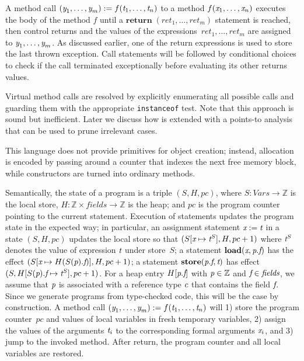 A method
call $(\textit{y}_1, \ldots, \textit{y}_m) := f(\textit{t}_1, \ldots, \textit{t}_n)$ to
a method $f(\textit{x}_1, \ldots, \textit{x}_n)$ executes the body of the method
$f$ until a $\textbf{return}\;(\textit{ret}_1, \ldots, \textit{ret}_m)$ 
statement is
reached, then control returns and the values of the
expressions~$\textit{ret}_1, \ldots, \textit{ret}_m$ are assigned to $\textit{y}_1,
\ldots, \textit{y}_m$. As discussed earlier, one of the return expressions is
used to store the last thrown exception. Call statements will be followed
by conditional choices to check if the call terminated exceptionally before
evaluating its other returns values.

Virtual method calls are resolved by explicitly enumerating
all possible calls and guarding them with the appropriate \texttt{instanceof}
test. Note that this approach is sound but inefficient. Later we discuss
how \jayhorn is extended with a points-to analysis that can be used to
prune irrelevant cases. 

This language does not provide primitives 
for object creation; instead, allocation is encoded by passing around a counter
that indexes the next free memory block, while constructors are turned
into ordinary methods.


Semantically, the state of a program is a triple $(S, H, pc)$, where
$S : \textit{Vars} \rightarrow \mathbb{Z}$ is the local store, $H :
\mathbb{Z}\times \textit{fields} \rightarrow \mathbb{Z}$ is the heap;
and $pc$ is the program counter pointing to the current
statement. Execution of statements updates the program state in the
expected way; in particular, an assignment statement $\textit{x}:=\textit{t}$ in
a state $(S, H, pc)$ updates the local store so that $(S[\textit{x}
\mapsto \textit{t}^S], H, pc+1)$ where $\textit{t}^S$ denotes the
  value of expression $\textit{t}$ under store~$S$; a statement
$\textbf{load}(\textit{x}, \textit{p}.\textit{f})$ has the effect $(S[\textit{x} \mapsto
H(S(\textit{p}).\textit{f})], H, pc+1)$; a statement
$\textbf{store}(\textit{p}.\textit{f}, \textit{t})$ has effect $(S,
H[S(\textit{p}).\textit{f}\mapsto \textit{t}^S], pc+1)$. For a heap entry
  $H[\textit{p}.\textit{f}]$ with $\textit{p} \in \mathbb{Z}$ and
  $\textit{f}\in\textit{fields}$, we assume that $\textit{p}$ is associated with
  a reference type $\textit{c}$ that contains the field $\textit{f}$.  Since we
  generate programs from type-checked code, this will be the case by
  construction. A method call $(\textit{y}_1, \ldots, \textit{y}_m) :=
f(\textit{t}_1, \ldots, \textit{t}_n)$ will 1) store the program counter~$pc$
and values of local variables in fresh temporary variables, 2)
assign the values of the arguments $\textit{t}_i$ to the corresponding
formal arguments $\textit{x}_i$, and 3) jump to the invoked method.
After return, the program counter and all local variables are
restored.

